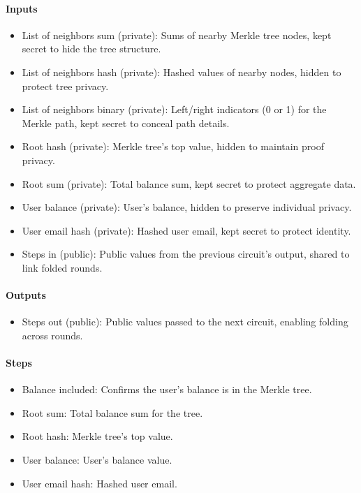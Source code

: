 \paragraph{Inputs}
\begin{itemize}
   \item List of neighbors sum (private): Sums of nearby Merkle tree nodes, kept secret to hide the tree structure.
   \item List of neighbors hash (private): Hashed values of nearby nodes, hidden to protect tree privacy.
   \item List of neighbors binary (private): Left/right indicators (0 or 1) for the Merkle path, kept secret to conceal path details.
   \item Root hash (private): Merkle tree's top value, hidden to maintain proof privacy.
   \item Root sum (private): Total balance sum, kept secret to protect aggregate data.
   \item User balance (private): User's balance, hidden to preserve individual privacy.
   \item User email hash (private): Hashed user email, kept secret to protect identity.
   \item Steps in (public): Public values from the previous circuit's output, shared to link folded rounds.
   \end{itemize}

\paragraph{Outputs}
\begin{itemize}
   \item Steps out (public): Public values passed to the next circuit, enabling folding across rounds.
   \end{itemize}

\paragraph{Steps}
\begin{itemize}
   \item Balance included: Confirms the user's balance is in the Merkle tree.
   \item Root sum: Total balance sum for the tree.
   \item Root hash: Merkle tree's top value.
   \item User balance: User's balance value.
   \item User email hash: Hashed user email.
   \end{itemize}

